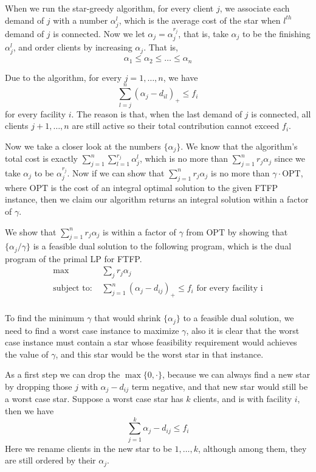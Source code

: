 \documentclass[oneside,final]{ucr}
\begin{document}
When we run the star-greedy algorithm, for every client $j$,
we associate each demand of $j$ with a number $\alpha_j^l$,
which is the average cost of the star when $l^{th}$ demand
of $j$ is connected. Now we let $\alpha_j = \alpha_j^{r_j}$,
that is, take $\alpha_j$ to be the finishing $\alpha_j^l$,
and order clients by increasing $\alpha_j$. That is,
\begin{equation*}
  \alpha_1 \leq \alpha_2 \leq \ldots \leq \alpha_n
\end{equation*}

Due to the algorithm, for every $j=1,\ldots,n$, we have
\begin{equation*}
  \sum_{l=j}^n (\alpha_j - d_{il})_+ \leq f_i
\end{equation*}
for every facility $i$.  The reason is that, when the last
demand of $j$ is connected, all clients $j+1,\ldots,n$ are
still active so their total contribution cannot exceed
$f_i$.

Now we take a closer look at the numbers $\{\alpha_j\}$. We
know that the algorithm's total cost is exactly
$\sum_{j=1}^n \sum_{l=1}^{r_j} \alpha_j^l$, which is no more
than $\sum_{j=1}^n r_j \alpha_j$ since we take $\alpha_j$ to
be $\alpha_j^{r_j}$. Now if we can show that $\sum_{j=1}^n
r_j \alpha_j$ is no more than $\gamma \cdot \textrm{OPT}$,
where $\textrm{OPT}$ is the cost of an integral optimal
solution to the given FTFP instance, then we claim our
algorithm returns an integral solution within a factor of
$\gamma$.

We show that $\sum_{j=1}^n r_j \alpha_j$ is within a factor
of $\gamma$ from $\textrm{OPT}$ by showing that
$\{\alpha_j/\gamma\}$ is a feasible dual solution to the
following program, which is the dual program of the primal
LP for FTFP.
\begin{align*}
  \max\; &\sum_j r_j\alpha_j\\
  \textrm{subject to: }& \sum_{j=1}^n (\alpha_j - d_{ij})_+
  \leq f_i \textrm{ for every facility i}\\
\end{align*}

To find the minimum $\gamma$ that would shrink
$\{\alpha_j\}$ to a feasible dual solution, we need to find
a worst case instance to maximize $\gamma$, also it is clear
that the worst case instance must contain a star whose
feasibility requirement would achieves the value of
$\gamma$, and this star would be the worst star in that
instance.

As a first step we can drop the $\max\{0, \cdot\}$, because
we can always find a new star by dropping those $j$ with
$\alpha_j - d_{ij}$ term negative, and that new star would
still be a worst case star. Suppose a worst case star has
$k$ clients, and is with facility $i$, then we have
\begin{equation*}
  \sum_{j=1}^k \alpha_j - d_{ij} \leq f_i
\end{equation*}
Here we rename clients in the new star to be $1,\ldots,k$,
although among them, they are still ordered by their
$\alpha_j$.
\end{document}
